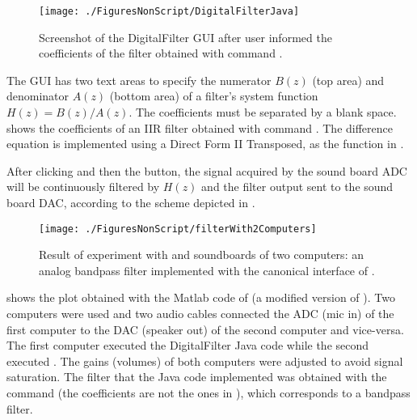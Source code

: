\begin{figure}
\centering
\texttt{[image: ./FiguresNonScript/DigitalFilterJava]}
\caption{Screenshot of the DigitalFilter GUI after user informed the coefficients of the filter obtained with {\matlab} command .\label{fig:DigitalFilterJava}}
\end{figure}

The GUI has two text areas to specify the numerator
$B(z)$ (top area) and denominator $A(z)$ (bottom area) of a
filter's system function $H(z)=B(z)/A(z)$. The coefficients must be separated by a blank space.
 shows the coefficients of an IIR filter obtained with {\matlab} command .
The difference equation is implemented using a Direct Form II Transposed, as the  function in {\matlab}.

After clicking  and then the  button, the signal acquired by the sound board ADC will be continuously filtered by $H(z)$ and the filter output sent to the sound board DAC,
according to the scheme depicted in .

\begin{figure}
\centering
\texttt{[image: ./FiguresNonScript/filterWith2Computers]}
\caption{Result of experiment with  and soundboards of two computers: an analog bandpass filter implemented with the canonical interface of .\label{fig:filterWith2Computers}}
\end{figure}

 shows the plot obtained with the Matlab code of  (a modified version of ). Two computers were used and two audio cables connected the ADC (mic in) of the first computer to the DAC (speaker out) of the second computer and vice-versa. The first computer executed the DigitalFilter Java code while the second executed . The gains (volumes) of both computers were adjusted to avoid signal saturation. The filter that the Java code implemented was obtained with the command  (the coefficients are not the ones in ), which corresponds to a bandpass filter. 


